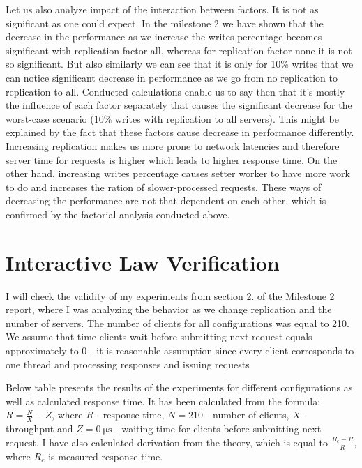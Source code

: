\documentclass[11pt]{article}
\begin{document}
Let us also analyze impact of the interaction between factors. It is not as significant as one could expect. In the milestone 2 we have shown that the decrease in the performance as we increase the writes percentage becomes significant with replication factor all, whereas for replication factor none it is not so significant. But also similarly we can see that it is only for 10\% writes that we can notice significant decrease in performance as we go from no replication to replication to all. Conducted calculations enable us to say then that it's mostly the influence of each factor separately that causes the significant decrease for the worst-case scenario (10\% writes with replication to all servers). This might be explained by the fact that these factors cause decrease in performance differently. Increasing replication makes us more prone to network latencies and therefore server time for requests is higher which leads to higher response time. On the other hand, increasing writes percentage causes setter worker to have more work to do and increases the ration of slower-processed requests. These ways of decreasing the performance are not that dependent on each other, which is confirmed by the factorial analysis conducted above.

\pagebreak

\section{Interactive Law Verification}\label{sec:interactive-law}

I will check the validity of my experiments from section 2. of the Milestone 2 report, where I was analyzing the behavior as we change replication and the number of servers. The number of clients for all configurations was equal to 210. We assume that time clients wait before submitting next request equals approximately to 0 - it is reasonable assumption since every client corresponds to one thread and processing responses and issuing requests 

Below table presents the results of the experiments for different configurations as well as calculated response time. It has been calculated from the formula: $R = \frac{N}{X} - Z$, where $R$ - response time, $N = 210$ - number of clients, $X$ - throughput and $Z=\SI{0}{\micro\second}$ - waiting time for clients before submitting next request. I have also calculated derivation from the theory, which is equal to $\frac{R_e - R}{R}$, where $R_e$ is measured response time.
\medskip
\end{document}
